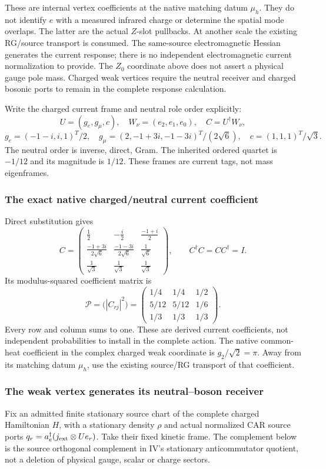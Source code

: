 \documentclass[12pt,a4paper]{article}
\begin{document}
These are internal vertex coefficients at the native matching datum
$\mu_h$. They do not identify $e$ with a measured infrared charge or
determine the spatial mode overlaps. The latter are the actual $Z$-slot
pullbacks. At another scale the existing RG/source transport is consumed.
The same-source electromagnetic Hessian generates the current response;
there is no independent electromagnetic current normalization to provide.
The $Z_0$ coordinate above does not assert a physical gauge pole mass.
Charged weak vertices require the neutral receiver and charged bosonic
ports to remain in the complete response calculation.


Write the charged current frame and neutral role order explicitly:
\[
 U=(g_e,g_\mu,c),\quad W_\nu=(e_2,e_1,e_0),\quad C=U^\dagger W_\nu,
\]
\[
 g_e=(-1-i,i,1)^T/2,\quad
 g_\mu=(2,-1+3i,-1-3i)^T/(2\sqrt6),\quad c=(1,1,1)^T/\sqrt3.
\]
The neutral order is inverse, direct, Gram. The inherited ordered quartet
is $-1/12$ and its magnitude is $1/12$. These frames are current tags,
not mass eigenframes.
\subsubsection{The exact native charged/neutral current coefficient}
Direct substitution gives
\[
 \boxed{
 C=\begin{pmatrix}
 \frac12&-\frac i2&\frac{-1+i}{2}\\
 \frac{-1+3i}{2\sqrt6}&\frac{-1-3i}{2\sqrt6}&\frac1{\sqrt6}\\
 \frac1{\sqrt3}&\frac1{\sqrt3}&\frac1{\sqrt3}
 \end{pmatrix},\qquad C^\dagger C=CC^\dagger=I.}
\]
Its modulus-squared coefficient matrix is
\[
 \boxed{\mathcal P=\bigl(|C_{rj}|^2\bigr)=
 \begin{pmatrix}
 1/4&1/4&1/2\\
 5/12&5/12&1/6\\
 1/3&1/3&1/3
 \end{pmatrix}.}
\]
Every row and column sums to one. These are derived current coefficients,
not independent probabilities to install in the complete action.
The native common-heat coefficient in the complex charged weak coordinate
is $g_2/\sqrt2=\pi$. Away from its matching datum $\mu_h$, use the existing
source/RG transport of that coefficient.

\subsubsection{The weak vertex generates its neutral--boson receiver}
Fix an admitted finite stationary source chart of the complete charged
Hamiltonian $H$, with a stationary density $\rho$ and actual normalized
CAR source ports $q_r=a_e^\dagger(j_{\rm ext}\otimes Ue_r)$.
Take their fixed kinetic frame. The complement below is the source
orthogonal complement in IV's stationary anticommutator quotient, not a deletion
of physical gauge, scalar or charge sectors.
\end{document}
